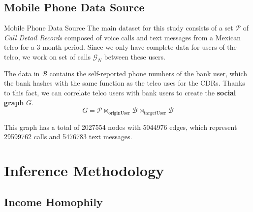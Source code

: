 \documentclass{beamer}
\newcommand{\mathB}{\mathcal{B}}
\newcommand{\mathG}{\mathcal{G}}
\newcommand{\mathP}{\mathcal{P}}
\begin{document}
\subsection{Mobile Phone Data Source}

\begin{frame}{Mobile Phone Data Source}
The main dataset for this study consists of a set \( \mathP \) of \textit{Call Detail Records} composed of voice calls and text messages from a Mexican telco for a 3 month period. Since we only have complete data for users of the telco, we work on set of calls \( \mathG_N \) between these users.

\medskip

The data in \( \mathB \) contains the self-reported phone numbers of the bank user, which the bank hashes with the same function as the telco uses for the CDRs. Thanks to this fact, we can correlate telco users with bank users to create the \textbf{social graph} \( G \).
\[
	G = \mathP \bowtie_{\operatorname{originUser}} \mathB \bowtie_{\operatorname{targetUser}} \mathB
\]

This graph has a total of \num{2027554} nodes with \num{5044976} edges, which represent \num{29599762} calls and \num{5476783} text messages.
\end{frame}

\section{Inference Methodology}
\subsection{Income Homophily}
\end{document}
